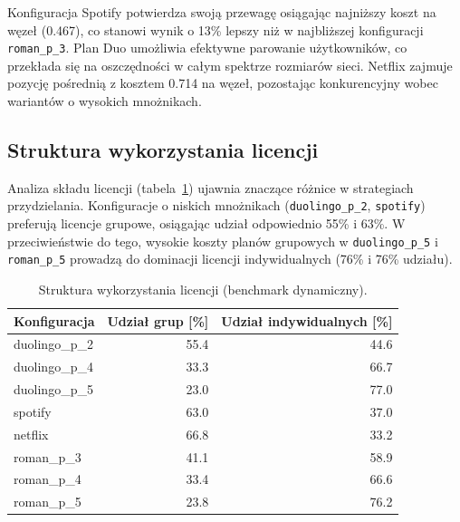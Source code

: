 Konfiguracja Spotify potwierdza swoją przewagę osiągając najniższy koszt na węzeł (0.467), co stanowi wynik o 13\% lepszy niż w najbliższej konfiguracji \texttt{roman\_p\_3}. Plan Duo umożliwia efektywne parowanie użytkowników, co przekłada się na oszczędności w całym spektrze rozmiarów sieci. Netflix zajmuje pozycję pośrednią z kosztem 0.714 na węzeł, pozostając konkurencyjny wobec wariantów o wysokich mnożnikach.

\subsection{Struktura wykorzystania licencji}

Analiza składu licencji (tabela~\ref{tab:ext-dynamic-license-mix}) ujawnia znaczące różnice w strategiach przydzielania. Konfiguracje o niskich mnożnikach (\texttt{duolingo\_p\_2}, \texttt{spotify}) preferują licencje grupowe, osiągając udział odpowiednio 55\% i 63\%. W przeciwieństwie do tego, wysokie koszty planów grupowych w \texttt{duolingo\_p\_5} i \texttt{roman\_p\_5} prowadzą do dominacji licencji indywidualnych (76\% i 76\% udziału).

\begin{table}[H]
    \centering
    \caption{Struktura wykorzystania licencji (benchmark dynamiczny).}
    \label{tab:ext-dynamic-license-mix}
    \begin{tabular}{lrr}
        \toprule
        \textbf{Konfiguracja} & \textbf{Udział grup [\%]} & \textbf{Udział indywidualnych [\%]} \\
        \midrule
        duolingo\_p\_2        & 55.4                      & 44.6                                \\
        duolingo\_p\_4        & 33.3                      & 66.7                                \\
        duolingo\_p\_5        & 23.0                      & 77.0                                \\
        spotify               & 63.0                      & 37.0                                \\
        netflix               & 66.8                      & 33.2                                \\
        roman\_p\_3           & 41.1                      & 58.9                                \\
        roman\_p\_4           & 33.4                      & 66.6                                \\
        roman\_p\_5           & 23.8                      & 76.2                                \\
        \bottomrule
    \end{tabular}
\end{table}

